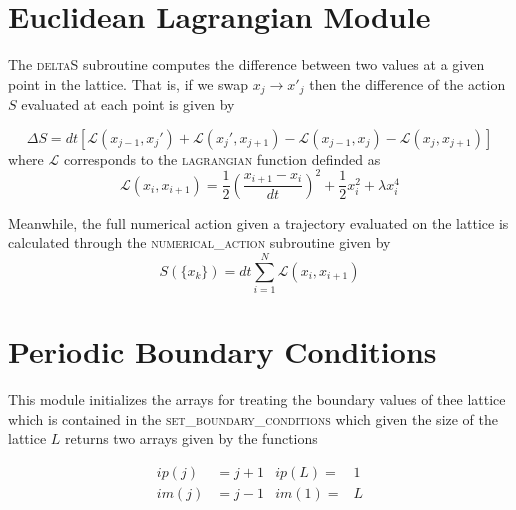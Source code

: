 \section{Euclidean Lagrangian Module}

The \textsc{deltaS} subroutine computes the difference between two values at a given point in the lattice. That is, if we swap $x_j \rightarrow x'_j$ then the difference of the action $S$ evaluated at each point  is given by 

\begin{equation}
    \Delta S = dt\left[ \mathcal{L }(x_{j-1}, x_{j}') + \mathcal{L }(x_{j}', x_{j+1}) - \mathcal{L}(x_{j-1}, x_j)-\mathcal{L}(x_j, x_{j+1})\right]
\end{equation}
where $\mathcal{L}$ corresponds to the \textsc{lagrangian} function definded as
\begin{equation}
    \mathcal{L}(x_{i}, x_{i+1}) = \frac{1}{2}\left(\frac{x_{i+1}-x_i}{dt}\right)^2 + \frac{1}{2}x_i^2  + \lambda x_i^4
\end{equation}

Meanwhile, the full numerical action given a trajectory evaluated on the lattice is calculated through the \textsc{numerical\_action} subroutine given by
\begin{equation}
    S(\{x_k\})=dt\sum_{i=1}^N \mathcal{L}(x_{i}, x_{i+1})
\end{equation}

\section{Periodic Boundary Conditions}

This module initializes the arrays for treating the boundary values of thee lattice which is contained in the \textsc{set\_boundary\_conditions} which given the size of the lattice $L$ returns two arrays given by the functions 

\begin{align}
     ip(j) &= j + 1  &  ip(L)=&1\\
    im(j) &= j - 1  &  im(1)=&L
\end{align}


